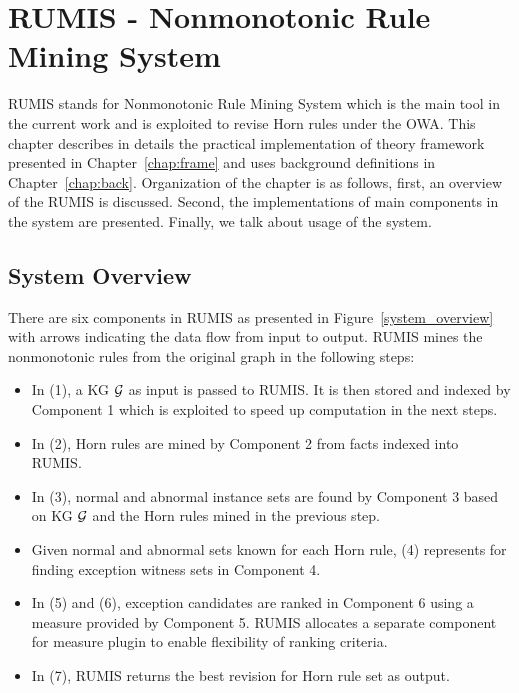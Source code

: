 \chapter{RUMIS - Nonmonotonic Rule Mining System}\label{chap:system}
\label{chap:system}

RUMIS stands for Nonmonotonic Rule Mining System which is the main tool in the current work and is exploited to revise Horn rules under the OWA. This chapter describes in details the practical implementation of theory framework presented in Chapter~\ref{chap:frame} and uses background definitions in Chapter~\ref{chap:back}. Organization of the chapter is as follows, first, an overview of the RUMIS is discussed. Second, the implementations of main components in the system are presented. Finally, we talk about usage of the system.

\section{System Overview}
\label{sec:overview}

There are six components in RUMIS as presented in Figure~\ref{system_overview} with arrows indicating the data flow from input to output. RUMIS mines the nonmonotonic rules from the original graph in the following steps:

\begin{itemize}
\item In (1), a KG $\mathcal{G}$ as input is passed to RUMIS. It is then stored and indexed by Component 1 which is exploited to speed up computation in the next steps.
\item In (2), Horn rules are mined by Component 2 from facts indexed into RUMIS.
\item In (3), normal and abnormal instance sets are found by Component 3 based on KG $\mathcal{G}$ and the Horn rules mined in the previous step.
\item Given normal and abnormal sets known for each Horn rule, (4) represents for finding exception witness sets in Component 4.
\item In (5) and (6), exception candidates are ranked in Component 6 using a measure provided by Component 5. RUMIS allocates a separate component for measure plugin to enable flexibility of ranking criteria.
\item In (7), RUMIS returns the best revision for Horn rule set as output.
\end{itemize}

